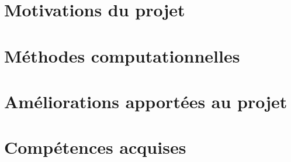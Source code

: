 
\author{
{\FirstNameA\ \AuthorA\ } 
{\FirstNameB\ \AuthorB\ }
}

\institute{
{\InstituteA }
{\InstituteB }
}           

\conference{\Conference}
 
\maketitle

\begin{multicols*}{4}

\section{Motivations du projet}
\ParagMotiv
\columnbreak

\section{Méthodes computationnelles}
\ParagMethComp
\columnbreak

\section{Améliorations apportées au projet}
\ParagAmelio
\columnbreak

\section{Compétences acquises}
\ParagCompAcqu

\end{multicols*}

